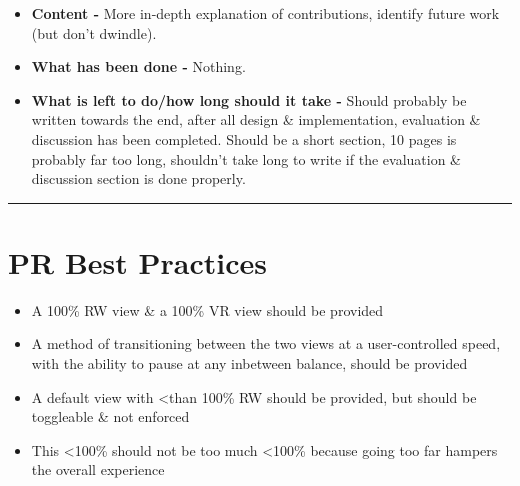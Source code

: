\begin{itemize}
	\item \textbf{Content -} More in-depth explanation of contributions, identify future work (but don't dwindle).
	\item \textbf{What has been done -} Nothing.
	\item \textbf{What is left to do/how long should it take -} Should probably be written towards the end, after all design \& implementation, evaluation \& discussion has been completed. Should be a short section, 10 pages is probably far too long, shouldn't take long to write if the evaluation \& discussion section is done properly.
\end{itemize}

\hrule





\section{PR Best Practices}

\begin{itemize}
	\item A 100\% RW view \& a 100\% VR view should be provided
	\item A method of transitioning between the two views at a user-controlled speed, with the ability to pause at any inbetween balance, should be provided
	\item A default view with \textless than 100\% RW should be provided, but should be toggleable \& not enforced
	\item This \textless 100\% should not be too much \textless 100\% because going too far hampers the overall experience
\end{itemize}






